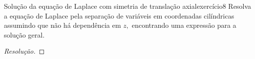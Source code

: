 \begin{exercício}{Solução da equação de Laplace com simetria de translação axial}{exercício8}
    Resolva a equação de Laplace pela separação de variáveis em coordenadas cilíndricas assumindo que não há dependência em \(z,\) encontrando uma expressão para a solução geral.
\end{exercício}
\begin{proof}[Resolução]

\end{proof}
